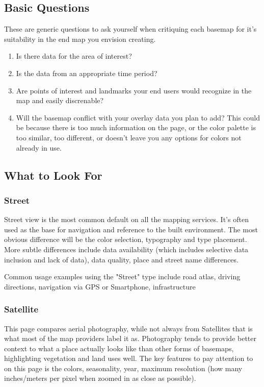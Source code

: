 \documentclass[12pt,letterpaper]{article}
\begin{document}
\subsection{Basic Questions}
These are generic questions to ask yourself when critiquing each basemap for it's suitability in the end map you envision creating.
\begin{enumerate}
\item Is there data for the area of interest?
\item Is the data from an appropriate time period?
\item Are points of interest and landmarks your end users would recognize in the map and easily discrenable?
\item Will the basemap conflict with your overlay data you plan to add? This could be because there is too much information on the page, or the color palette is too similar, too different, or doesn't leave you any options for colors not already in use.
\end{enumerate}

\subsection{What to Look For}
\subsubsection{Street}
Street view is the most common default on all the mapping services. It's often used as the base for navigation and reference to the built environment. The most obvious difference will be the color selection, typography and type placement. More subtle differences include data availability (which includes selective data inclusion and lack of data), data quality, place and street name differences.

Common usage examples using the "Street" type include road atlas, driving directions, navigation via GPS or Smartphone, infrastructure  


\subsubsection{Satellite}
This page compares aerial photography, while not always from Satellites that is what most of the map providers label it as. Photography tends to provide better context to what a place actually looks like than other forms of basemaps, highlighting vegetation and land uses well. The key features to pay attention to on this page is the colors, seasonality, year, maximum resolution (how many inches/meters per pixel when zoomed in as close as possible).
\end{document}
